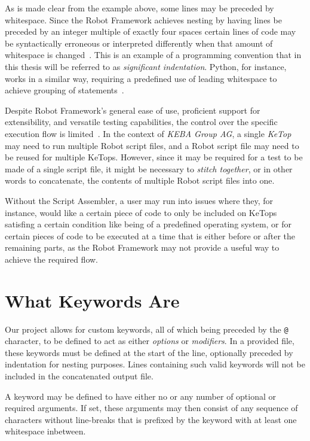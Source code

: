 As is made clear from the example above, some lines may be preceded by whitespace. Since the Robot Framework achieves nesting by having lines be preceded by an integer multiple of exactly four spaces certain lines of code may be syntactically erroneous or interpreted differently when that amount of whitespace is changed~\cite{robot-framework-style-guide}. This is an example of a programming convention that in this thesis will be referred to as \textit{significant indentation}. Python, for instance, works in a similar way, requiring a predefined use of leading whitespace to achieve grouping of statements~\cite{py-indentation}.

Despite Robot Framework's general ease of use, proficient support for extensibility, and versatile testing capabilities, the control over the specific execution flow is limited~\cite{robot-framework-pros-cons}. In the context of \textit{KEBA Group AG}, a single \textit{KeTop} may need to run multiple Robot script files, and a Robot script file may need to be reused for multiple KeTops. However, since it may be required for a test to be made of a single script file, it might be necessary to \textit{stitch together}, or in other words to concatenate, the contents of multiple Robot script files into one. 

Without the Script Assembler, a user may run into issues where they, for instance, would like a certain piece of code to only be included on KeTops satisfing a certain condition like being of a predefined operating system, or for certain pieces of code to be executed at a time that is either before or after the remaining parts, as the Robot Framework may not provide a useful way to achieve the required flow. 

\section{What Keywords Are}

Our project allows for custom keywords, all of which being preceded by the \verb|@| character, to be defined to act as either \textit{options} or \textit{modifiers}. In a provided file, these keywords must be defined at the start of the line, optionally preceded by indentation for nesting purposes. Lines containing such valid keywords will not be included in the concatenated output file. 

A keyword may be defined to have either no or any number of optional or required arguments. If set, these arguments may then consist of any sequence of characters without line-breaks that is prefixed by the keyword with at least one whitespace inbetween. 

